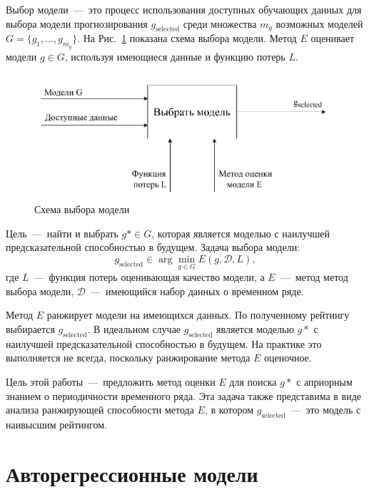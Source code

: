 \documentclass[article,14pt,subf,href,colorlinks=true
]{disser}
\begin{document}
Выбор модели~---~это процесс использования доступных обучающих данных для выбора модели прогнозирования $g_{\text{selected}}$ среди множества $m_{g}$ возможных моделей $G = \{g_1,...,g_{m_{g}}\}$.
На Рис.~\ref{fg:ms_pipline} показана схема выбора модели.
Метод $E$ оценивает модели $g \in G$, используя имеющиеся данные и функцию потерь $L$.

\begin{figure}[H]
    \centering
    \captionsetup{justification=centering,margin=2cm}
    \includegraphics[scale=0.7]{figs/model_selection_pipline.pdf}
    \caption{Схема выбора модели}
    \label{fg:ms_pipline}
\end{figure}

Цель~---~найти и выбрать $g* \in G$, которая является моделью с наилучшей предсказательной способностью в будущем.
Задача выбора модели:
\begin{equation}
    g_{\text{selected}} \in \arg \min_{g \in G} E(g, \mathcal{D}, L),
\label{eq:model_selection_proplem_statement}
\end{equation}
где $L$~---~функция потерь оценивающая качество модели, а $E$~---~метод метод выбора модели, $\mathcal{D}$~---~имеющийся набор данных о временном ряде.

Метод $E$ ранжирует модели на имеющихся данных.
По полученному рейтингу выбирается $g_{\text{selected}}$.
В идеальном случае $g_{\text{selected}}$ является моделью $g*$ с наилучшей предсказательной способностью в будущем.
На практике это выполняется не всегда, поскольку ранжирование метода $E$ оценочное.

Цель этой работы~---~предложить метод оценки $E$ для поиска $g*$ с априорным знанием о периодичности временного ряда.
Эта задача также представима в виде анализа ранжирующей способности метода $E$, в котором $g_{\text{selected}}$~---~это модель с наивысшим рейтингом.
\newpage
\section{Авторегрессионные модели}
\end{document}
